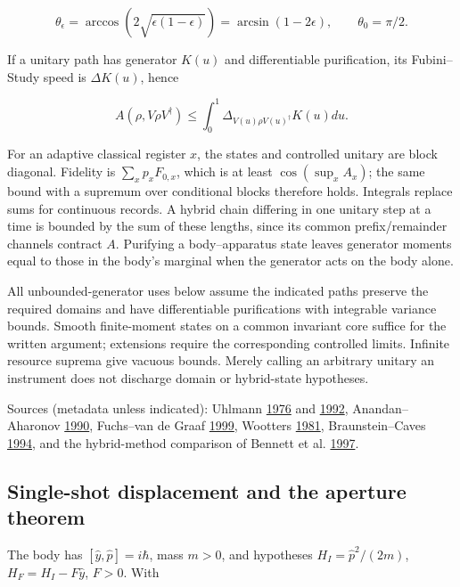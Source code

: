 \documentclass[11pt,a4paper]{article}
\begin{document}
\[\theta_\epsilon=\arccos(2\sqrt{\epsilon(1-\epsilon)})
 =\arcsin(1-2\epsilon),\qquad\theta_0=\pi/2.\]

If a unitary path has generator \(K(u)\) and differentiable
purification, its Fubini--Study speed is \(\Delta K(u)\), hence

\[A(\rho,V\rho V^\dagger)\le\int_0^1\Delta_{V(u)\rho V(u)^\dagger}K(u)du.\]

For an adaptive classical register \(x\), the states and controlled
unitary are block diagonal. Fidelity is \(\sum_xp_xF_{0,x}\), which is
at least \(\cos(\sup_xA_x)\); the same bound with a supremum over
conditional blocks therefore holds. Integrals replace sums for
continuous records. A hybrid chain differing in one unitary step at a
time is bounded by the sum of these lengths, since its common
prefix/remainder channels contract \(A\). Purifying a body--apparatus
state leaves generator moments equal to those in the body's marginal
when the generator acts on the body alone.

All unbounded-generator uses below assume the indicated paths preserve
the required domains and have differentiable purifications with
integrable variance bounds. Smooth finite-moment states on a common
invariant core suffice for the written argument; extensions require the
corresponding controlled limits. Infinite resource suprema give vacuous
bounds. Merely calling an arbitrary unitary an instrument does not
discharge domain or hybrid-state hypotheses.

Sources (metadata unless indicated): Uhlmann
\href{https://doi.org/10.1016/0034-4877(76)90060-4}{1976} and
\href{https://doi.org/10.1016/0375-9601(92)90555-Z}{1992},
Anandan--Aharonov
\href{https://doi.org/10.1103/PhysRevLett.65.1697}{1990}, Fuchs--van de
Graaf \href{https://doi.org/10.1109/18.761271}{1999}, Wootters
\href{https://doi.org/10.1103/PhysRevD.23.357}{1981}, Braunstein--Caves
\href{https://doi.org/10.1103/PhysRevLett.72.3439}{1994}, and the
hybrid-method comparison of Bennett et al.
\href{https://doi.org/10.1137/S0097539796300933}{1997}.

\hypertarget{single-shot-displacement-and-the-aperture-theorem}{%
\subsection{Single-shot displacement and the aperture
theorem}\label{single-shot-displacement-and-the-aperture-theorem}}

The body has \([\hat y,\hat p]=i\hbar\), mass \(m>0\), and hypotheses
\(H_I=\hat p^2/(2m)\), \(H_F=H_I-F\hat y\), \(F>0\). With
\end{document}

